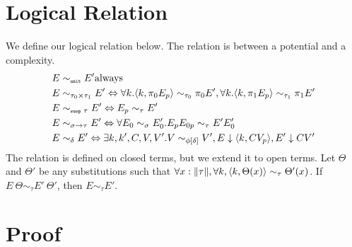 \section{Logical Relation}
We define our logical relation below. The relation is between a potential and a
complexity.
%
\begin{align*}
  E &\sim_{\texttt{\tiny{unit}}} E' \text{always}  \\
  E &\sim_{\tau_0 \times \tau_1} E' \Leftrightarrow \forall k. \langle k, \pi_0 E_p\rangle \sim_{\tau_0} \pi_0 E', \forall k. \langle k, \pi_1 E_p\rangle \sim_{\tau_1} \pi_1 E' \\
  E &\sim_{\texttt{\tiny{susp }} \tau} E' \Leftrightarrow E_p \sim_\tau E' \\
  E &\sim_{\sigma \to \tau} E' \Leftrightarrow \forall E_0 \sim_\sigma E'_0. E_p E_{0p} \sim_\tau E' E'_0 \\
  E &\sim_\delta E' \Leftrightarrow \exists k, k', C, V, V'. V \sim_{\phi[\delta]} V', E \downarrow \langle k, C V_p \rangle, E' \downarrow C V'
\end{align*}
%
The relation is defined on closed terms, but we extend it to open terms.  Let
$\Theta$ and $\Theta'$ be any substitutions such that $\forall x : \|\tau\|,
\forall k, \langle k, \Theta(x) \rangle \sim_\tau \Theta'(x)$.  If $E\ \Theta \sim_\tau
E'\ \Theta'$, then $E \sim_\tau E'$.


\section{Proof}

